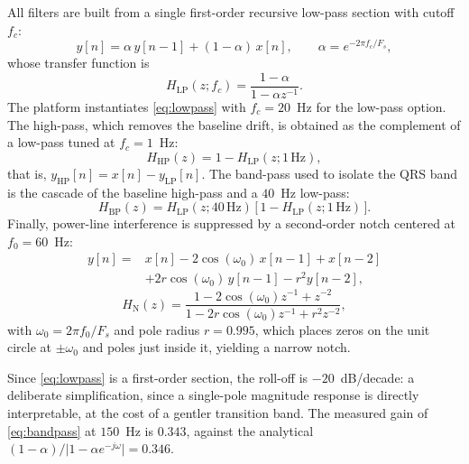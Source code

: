 \documentclass[conference]{IEEEtran}
\begin{document}
All filters are built from a single first-order recursive low-pass section with cutoff $f_c$:
\begin{equation}
y[n] = \alpha\, y[n-1] + (1-\alpha)\, x[n], \qquad \alpha = e^{-2\pi f_c / F_s},
\label{eq:lowpass}
\end{equation}
whose transfer function is
\begin{equation}
H_{\mathrm{LP}}(z;f_c) = \frac{1-\alpha}{1-\alpha z^{-1}}.
\label{eq:lowpasstf}
\end{equation}
The platform instantiates \eqref{eq:lowpass} with $f_c=20$~Hz for the low-pass option. The high-pass, which removes the baseline drift, is obtained as the complement of a low-pass tuned at $f_c=1$~Hz:
\begin{equation}
H_{\mathrm{HP}}(z) = 1 - H_{\mathrm{LP}}(z;1\,\mathrm{Hz}),
\label{eq:highpass}
\end{equation}
that is, $y_{\mathrm{HP}}[n]=x[n]-y_{\mathrm{LP}}[n]$. The band-pass used to isolate the QRS band is the cascade of the baseline high-pass and a $40$~Hz low-pass:
\begin{equation}
H_{\mathrm{BP}}(z) = H_{\mathrm{LP}}(z;40\,\mathrm{Hz})\,\bigl[\,1 - H_{\mathrm{LP}}(z;1\,\mathrm{Hz})\,\bigr].
\label{eq:bandpass}
\end{equation}
Finally, power-line interference is suppressed by a second-order notch centered at $f_0=60$~Hz:
\begin{equation}
\begin{split}
y[n] = {}& x[n] - 2\cos(\omega_0)\,x[n-1] + x[n-2] \\
        & + 2r\cos(\omega_0)\,y[n-1] - r^{2}y[n-2],
\end{split}
\label{eq:notch}
\end{equation}
\begin{equation}
H_{\mathrm{N}}(z) = \frac{1-2\cos(\omega_0)z^{-1}+z^{-2}}{1-2r\cos(\omega_0)z^{-1}+r^{2}z^{-2}},
\label{eq:notchtf}
\end{equation}
with $\omega_0 = 2\pi f_0/F_s$ and pole radius $r=0.995$, which places zeros on the unit circle at $\pm\omega_0$ and poles just inside it, yielding a narrow notch.

Since \eqref{eq:lowpass} is a first-order section, the roll-off is $-20$~dB/decade: a deliberate simplification, since a single-pole magnitude response is directly interpretable, at the cost of a gentler transition band. The measured gain of \eqref{eq:bandpass} at $150$~Hz is $0.343$, against the analytical $(1-\alpha)/\lvert 1-\alpha e^{-j\omega}\rvert = 0.346$.
\end{document}
